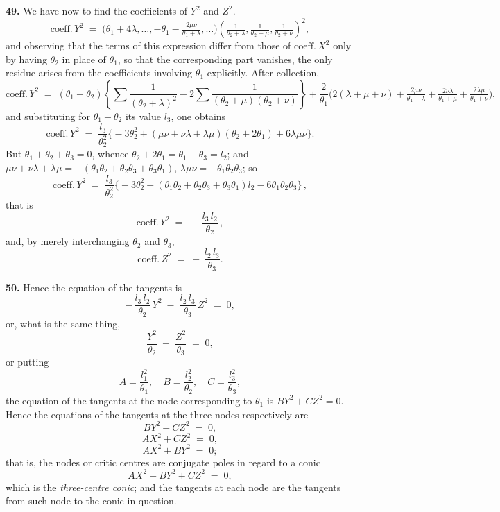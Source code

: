 \documentclass[11pt,a4paper]{article}
\begin{document}
\medskip

\textbf{49.} We have now to find the coefficients of $Y^{2}$ and $Z^{2}$.
\[
\text{coeff.}\, Y^{2} \;=\; \bigl(\theta_{1}+4\lambda,\ldots,-\theta_{1}-\tfrac{2\mu\nu}{\theta_{1}+\lambda},\ldots\bigr)\!\left(\tfrac{1}{\theta_{2}+\lambda},\tfrac{1}{\theta_{2}+\mu},\tfrac{1}{\theta_{2}+\nu}\right)^{2}\!,
\]
and observing that the terms of this expression differ from those of $\text{coeff.}\, X^{2}$ only by having $\theta_{2}$ in place of $\theta_{1}$, so that the corresponding part vanishes, the only residue arises from the coefficients involving $\theta_{1}$ explicitly. After collection,
\[
\text{coeff.}\, Y^{2} \;=\; (\theta_{1}-\theta_{2})\!\left\{\sum\frac{1}{(\theta_{2}+\lambda)^{2}}-2\sum\frac{1}{(\theta_{2}+\mu)(\theta_{2}+\nu)}\right\}+\frac{2}{\theta_{1}}\bigl(2(\lambda+\mu+\nu)+\tfrac{2\mu\nu}{\theta_{1}+\lambda}+\tfrac{2\nu\lambda}{\theta_{1}+\mu}+\tfrac{2\lambda\mu}{\theta_{1}+\nu}\bigr),
\]
and substituting for $\theta_{1}-\theta_{2}$ its value $l_{3}$, one obtains
\[
\text{coeff.}\, Y^{2} \;=\; \frac{l_{3}}{\theta_{2}^{2}}\bigl\{-3\theta_{2}^{2} + (\mu\nu+\nu\lambda+\lambda\mu)(\theta_{2}+2\theta_{1})+6\lambda\mu\nu\bigr\}.
\]
But $\theta_{1}+\theta_{2}+\theta_{3}=0$, whence $\theta_{2}+2\theta_{1}=\theta_{1}-\theta_{3}=l_{2}$; and $\mu\nu+\nu\lambda+\lambda\mu = -(\theta_{1}\theta_{2}+\theta_{2}\theta_{3}+\theta_{3}\theta_{1})$, $\lambda\mu\nu = -\theta_{1}\theta_{2}\theta_{3}$; so
\[
\text{coeff.}\, Y^{2} \;=\; \frac{l_{3}}{\theta_{2}^{2}}\bigl\{-3\theta_{2}^{2}-(\theta_{1}\theta_{2}+\theta_{2}\theta_{3}+\theta_{3}\theta_{1})l_{2}-6\theta_{1}\theta_{2}\theta_{3}\bigr\}\,,
\]
that is
\[
\text{coeff.}\, Y^{2} \;=\; -\,\frac{l_{3}\,l_{2}}{\theta_{2}}\,,
\]
and, by merely interchanging $\theta_{2}$ and $\theta_{3}$,
\[
\text{coeff.}\, Z^{2} \;=\; -\,\frac{l_{2}\,l_{3}}{\theta_{3}}.
\]

\medskip

\textbf{50.} Hence the equation of the tangents is
\[
-\,\frac{l_{3}\,l_{2}}{\theta_{2}}\,Y^{2} \;-\; \frac{l_{2}\,l_{3}}{\theta_{3}}\,Z^{2} \;=\; 0,
\]
or, what is the same thing,
\[
\frac{Y^{2}}{\theta_{2}} \;+\; \frac{Z^{2}}{\theta_{3}} \;=\; 0,
\]
or putting
\[
A=\frac{l_{1}^{2}}{\theta_{1}},\quad B=\frac{l_{2}^{2}}{\theta_{2}},\quad C=\frac{l_{3}^{2}}{\theta_{3}},
\]
the equation of the tangents at the node corresponding to $\theta_{1}$ is $B Y^{2} + C Z^{2} = 0$. Hence the equations of the tangents at the three nodes respectively are
\[
B Y^{2} + C Z^{2} \;=\; 0,
\]
\[
A X^{2} + C Z^{2} \;=\; 0,
\]
\[
A X^{2} + B Y^{2} \;=\; 0;
\]
that is, the nodes or critic centres are conjugate poles in regard to a conic
\[
A X^{2} + B Y^{2} + C Z^{2} \;=\; 0,
\]
which is the \emph{three-centre conic}; and the tangents at each node are the tangents from such node to the conic in question.
\end{document}
